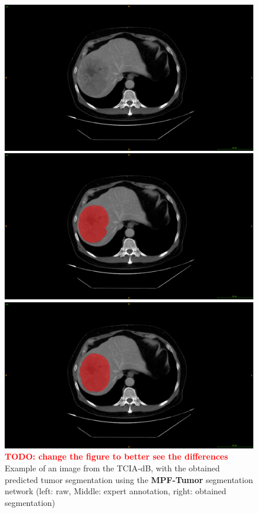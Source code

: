 \documentclass[]{article}
\newcommand{\pplfont}[1]{{\textbf{\fontfamily{ppl}\selectfont #1}}}
\newcommand{\lmttfont}[1]{{\fontfamily{lmtt}\selectfont #1}}
\begin{document}
\begin{figure}
\begin{minipage}{0.3\linewidth}
\includegraphics[width=\linewidth]{./images/image13.png}
\end{minipage}
\hspace{0.1cm}
\begin{minipage}{0.3\linewidth}
\includegraphics[width=\linewidth]{./images/image10.png}
\end{minipage}
\hspace{0.1cm}
\begin{minipage}{0.3\linewidth}
\includegraphics[width=\linewidth]{./images/image7.png}
\end{minipage}
\caption{\textcolor{red}{\textbf{TODO: change the figure to better see the differences}}
Example of an image from the \lmttfont{TCIA-dB}, with the obtained predicted tumor
segmentation using the \pplfont{MPF-Tumor} segmentation network (left: raw,
Middle: expert annotation, right: obtained segmentation)}
\label{fig:TCIAMultiphaseTumorPred}
\end{figure}
\end{document}
